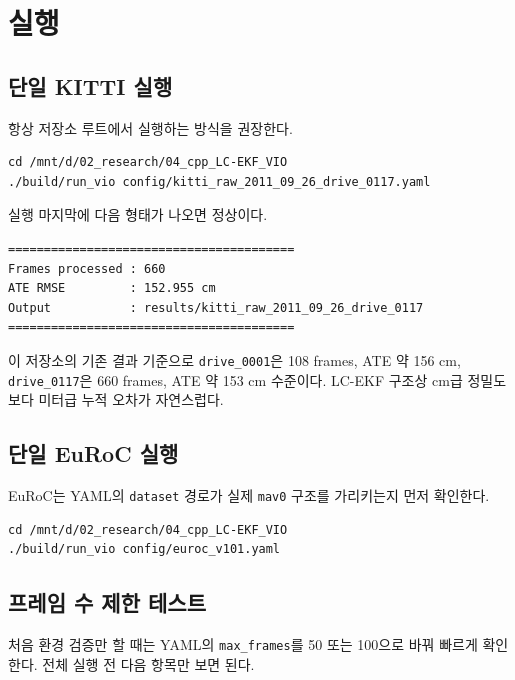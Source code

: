 \documentclass[11pt,a4paper,oneside]{report}
\begin{document}
\chapter{실행}

\section{단일 KITTI 실행}

항상 저장소 루트에서 실행하는 방식을 권장한다.

\begin{lstlisting}[style=shell,caption={KITTI 실행}]
cd /mnt/d/02_research/04_cpp_LC-EKF_VIO
./build/run_vio config/kitti_raw_2011_09_26_drive_0117.yaml
\end{lstlisting}

실행 마지막에 다음 형태가 나오면 정상이다.

\begin{lstlisting}[style=shell,caption={정상 종료 예시}]
========================================
Frames processed : 660
ATE RMSE         : 152.955 cm
Output           : results/kitti_raw_2011_09_26_drive_0117
========================================
\end{lstlisting}

이 저장소의 기존 결과 기준으로 \texttt{drive\_0001}은 108 frames, ATE 약 156 cm,
\texttt{drive\_0117}은 660 frames, ATE 약 153 cm 수준이다. LC-EKF 구조상 cm급 정밀도보다
미터급 누적 오차가 자연스럽다.

\section{단일 EuRoC 실행}

EuRoC는 YAML의 \texttt{dataset} 경로가 실제 \texttt{mav0} 구조를 가리키는지 먼저 확인한다.

\begin{lstlisting}[style=shell,caption={EuRoC 실행}]
cd /mnt/d/02_research/04_cpp_LC-EKF_VIO
./build/run_vio config/euroc_v101.yaml
\end{lstlisting}

\section{프레임 수 제한 테스트}

처음 환경 검증만 할 때는 YAML의 \texttt{max\_frames}를 50 또는 100으로 바꿔 빠르게
확인한다. 전체 실행 전 다음 항목만 보면 된다.
\end{document}
